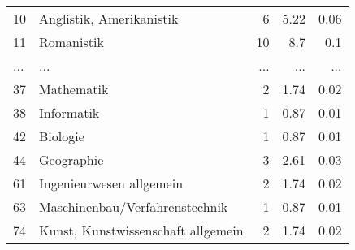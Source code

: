 \begin{longtable}{lXrrr}
        10 & \multicolumn{1}{X}{Anglistik, Amerikanistik} & %
          \num{6} &
          \num[round-mode=places,round-precision=2]{5.22} &
          \num[round-mode=places,round-precision=2]{0.06} \\
        11 & \multicolumn{1}{X}{Romanistik} & %
          \num{10} &
          \num[round-mode=places,round-precision=2]{8.7} &
          \num[round-mode=places,round-precision=2]{0.1} \\
       ... & ... & ... & ... & ... \\
        37 & \multicolumn{1}{X}{Mathematik} & %
          \num{2} &
          \num[round-mode=places,round-precision=2]{1.74} &
          \num[round-mode=places,round-precision=2]{0.02} \\

        38 & \multicolumn{1}{X}{Informatik} & %
          \num{1} &
          \num[round-mode=places,round-precision=2]{0.87} &
          \num[round-mode=places,round-precision=2]{0.01} \\

        42 & \multicolumn{1}{X}{Biologie} & %
          \num{1} &
          \num[round-mode=places,round-precision=2]{0.87} &
          \num[round-mode=places,round-precision=2]{0.01} \\

        44 & \multicolumn{1}{X}{Geographie} & %
          \num{3} &
          \num[round-mode=places,round-precision=2]{2.61} &
          \num[round-mode=places,round-precision=2]{0.03} \\

        61 & \multicolumn{1}{X}{Ingenieurwesen allgemein} & %
          \num{2} &
          \num[round-mode=places,round-precision=2]{1.74} &
          \num[round-mode=places,round-precision=2]{0.02} \\

        63 & \multicolumn{1}{X}{Maschinenbau/Verfahrenstechnik} & %
          \num{1} &
          \num[round-mode=places,round-precision=2]{0.87} &
          \num[round-mode=places,round-precision=2]{0.01} \\

        74 & \multicolumn{1}{X}{Kunst, Kunstwissenschaft allgemein} & %
          \num{2} &
          \num[round-mode=places,round-precision=2]{1.74} &
          \num[round-mode=places,round-precision=2]{0.02} \\


\end{longtable}

